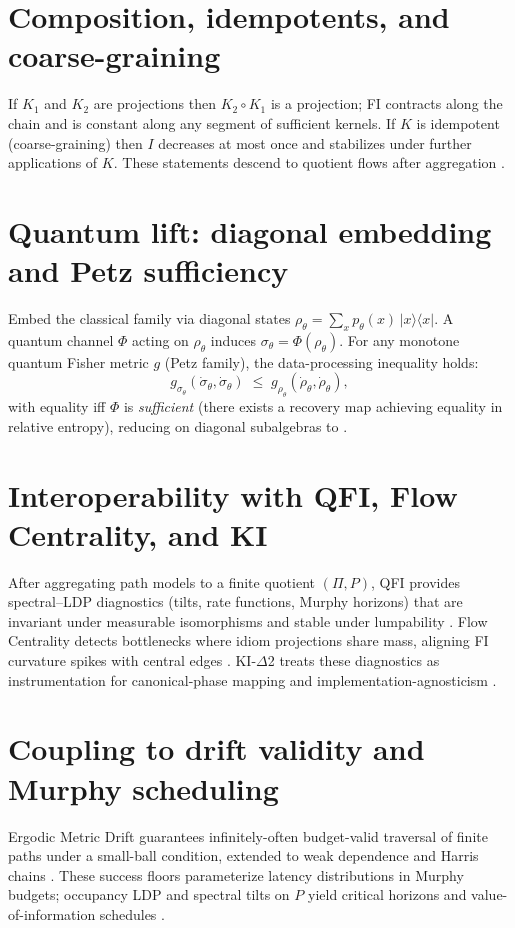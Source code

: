 \documentclass[11pt]{article}
\theoremstyle{plain}
\theoremstyle{definition}
\theoremstyle{remark}
\newcommand{\1}{\mathbbm{1}}
\begin{document}
\section{Composition, idempotents, and coarse-graining}
If \(K_1\) and \(K_2\) are projections then \(K_2\circ K_1\) is a projection; FI contracts along the chain and is constant along any segment of sufficient kernels. If \(K\) is idempotent (coarse-graining) then \(I\) decreases at most once and stabilizes under further applications of \(K\). These statements descend to quotient flows after aggregation \parencite{elliott2025qfi,elliott2025flow}.

\section{Quantum lift: diagonal embedding and Petz sufficiency}
Embed the classical family via diagonal states \(\rho_\theta=\sum_x p_\theta(x)\,|x\rangle\!\langle x|\). A quantum channel \(\Phi\) acting on \(\rho_\theta\) induces \( \sigma_\theta=\Phi(\rho_\theta)\). For any monotone quantum Fisher metric \(g\) (Petz family), the data-processing inequality holds:
\[
g_{\sigma_\theta}(\dot\sigma_\theta,\dot\sigma_\theta)\;\le\; g_{\rho_\theta}(\dot\rho_\theta,\dot\rho_\theta),
\]
with equality iff \(\Phi\) is \emph{sufficient} (there exists a recovery map achieving equality in relative entropy), reducing on diagonal subalgebras to  \parencite{Petz1986,Petz1996}.

\section{Interoperability with QFI, Flow Centrality, and KI}\label{sec:interop}
After aggregating path models to a finite quotient \((\Pi,P)\), QFI provides spectral--LDP diagnostics (tilts, rate functions, Murphy horizons) that are invariant under measurable isomorphisms and stable under lumpability \parencite{elliott2025qfi,DemboZeitouni1998}. Flow Centrality detects bottlenecks where idiom projections share mass, aligning FI curvature spikes with central edges \parencite{elliott2025flow}. KI-\(\Delta\)2 treats these diagnostics as instrumentation for canonical-phase mapping and implementation-agnosticism \parencite{elliott2025ki}.

\section{Coupling to drift validity and Murphy scheduling}
Ergodic Metric Drift guarantees infinitely-often budget-valid traversal of finite paths under a small-ball condition, extended to weak dependence and Harris chains \parencite{elliott2025drift,KochenStone1964,Freedman1975,MeynTweedie2009}. These success floors parameterize latency distributions in Murphy budgets; occupancy LDP and spectral tilts on \(P\) yield critical horizons and value-of-information schedules \parencite{elliott2025pmb,elliott2025qfi}.
\end{document}
